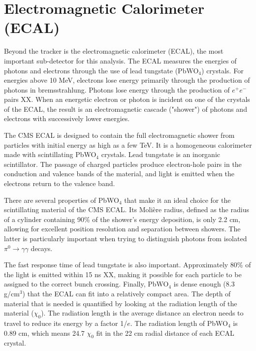 

\section{Electromagnetic Calorimeter (ECAL)}
\label{sec:ECAL}

Beyond the tracker is the electromagnetic calorimeter (ECAL), the most important sub-detector for this analysis. The ECAL measures the energies of photons and electrons through the use of lead tungstate (PbWO$_4$) crystals. For energies above 10 MeV, electrons lose energy primarily through the production of photons in bremsstrahlung. Photons lose energy through the production of $e^+e^-$ pairs \cite{Calo} XX. When an energetic electron or photon is incident on one of the crystals of the ECAL, the result is an electromagnetic cascade ("shower") of photons and electrons with successively lower energies.

The CMS ECAL is designed to contain the full electromagnetic shower from particles with initial energy as high as a few TeV. It is a homogeneous calorimeter made with scintillating PbWO$_4$ crystals. Lead tungstate is an inorganic scintillator. The passage of charged particles produce electron-hole pairs in the conduction and valence bands of the material, and light is emitted when the electrons return to the valence band.

There are several properties of PbWO$_4$ that make it an ideal choice for the scintillating material of the CMS ECAL. Its Moli\`{e}re radius, defined as the radius of a cylinder containing 90\% of the shower's energy deposition, is only 2.2 cm, allowing for excellent position resolution and separation between showers. The latter is particularly important when trying to distinguish photons from isolated $\pi^0\rightarrow\gamma\gamma$ decays.

The fast response time of lead tungstate is also important. Approximately 80\% of the light is emitted within 15 ns \cite{Calo} XX, making it possible for each particle to be assigned to the correct bunch crossing. Finally, PbWO$_4$ is dense enough (8.3 g/cm$^3$) that the ECAL can fit into a relatively compact area. The depth of material that is needed is quantified by looking at the radiation length of the material ($\chi_0$). The radiation length is the average distance an electron needs to travel to reduce its energy by a factor 1/$e$. The radiation length of PbWO$_4$ is 0.89 cm, which means 24.7 $\chi_0$ fit in the 22 cm radial distance of each ECAL crystal.

